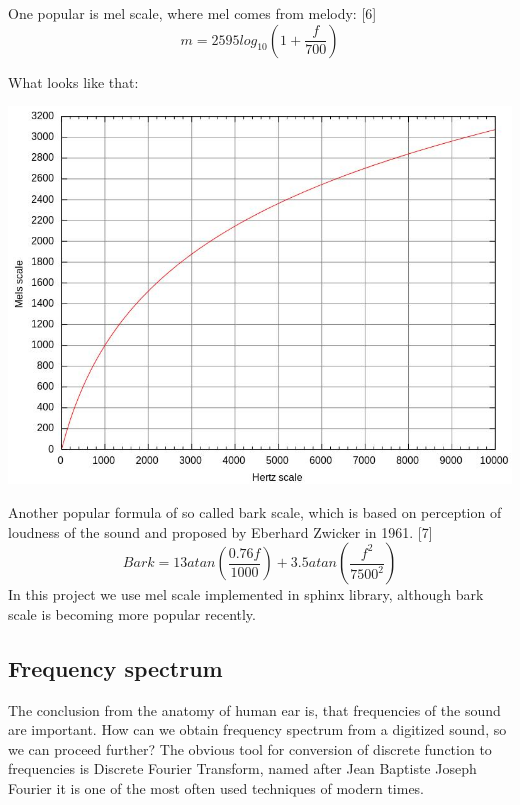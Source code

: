 \documentclass[12pt,a4paper,english]{article}
\begin{document}
One popular is mel scale, where mel comes from melody: [6] \newline
\begin{equation}
    m = 2595log_{10}(1 + \frac{f}{700})
\end{equation}
	
What looks like that:
\begin{center}
    \includegraphics[scale=0.3]{mel_scale.jpg}
\end {center}

Another popular formula of so called bark scale, which is based on perception of loudness of the sound and proposed by Eberhard Zwicker in 1961. [7] \newline
\begin{equation}
    Bark = 13 atan(\frac{0.76f}{1000}) + 3.5 atan(\frac{f^2}{7500^2})
\end{equation}
In this project we use mel scale implemented in sphinx library, although bark scale is becoming more popular recently.

\newpage
\subsection{Frequency spectrum}

The conclusion from the anatomy of human ear is, that frequencies of the sound are important.
How can we obtain frequency spectrum from a digitized sound, so we can proceed further? \newline
The obvious tool for conversion of discrete function to frequencies is Discrete Fourier Transform, named after Jean Baptiste Joseph Fourier it is one of the most often used techniques of modern times. \newline
\end{document}
